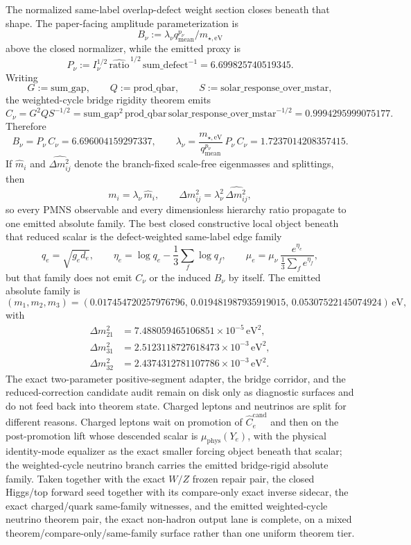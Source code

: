\documentclass[11pt]{article}
\begin{document}
The normalized same-label overlap-defect weight section closes beneath that shape. The paper-facing amplitude parameterization is
\[
B_\nu:=\lambda_\nu q_{\mathrm{mean}}^{p_\nu}/m_{\star,\mathrm{eV}}
\]
above the closed normalizer, while the emitted proxy is
\[
P_\nu:=I_\nu^{1/2}\,\widehat{\mathrm{ratio}}^{\,1/2}\,\mathrm{sum\_defect}^{-1}=6.699825740519345.
\]
Writing
\[
G:=\mathrm{sum\_gap},
\qquad
Q:=\mathrm{prod\_qbar},
\qquad
S:=\mathrm{solar\_response\_over\_mstar},
\]
the weighted-cycle bridge rigidity theorem emits
\[
C_\nu
=
G^2Q S^{-1/2}
=
\mathrm{sum\_gap}^2\,\mathrm{prod\_qbar}\,\mathrm{solar\_response\_over\_mstar}^{-1/2}
=
0.9994295999075177.
\]
Therefore
\[
B_\nu=P_\nu\,C_\nu=6.696004159297337,
\qquad
\lambda_\nu=\frac{m_{\star,\mathrm{eV}}}{q_{\mathrm{mean}}^{p_\nu}}\,P_\nu\,C_\nu=1.7237014208357415.
\]
If \(\hat m_i\) and \(\widehat{\Delta m_{ij}^2}\) denote the branch-fixed scale-free eigenmasses and splittings, then
\[
m_i=\lambda_\nu\,\hat m_i,
\qquad
\Delta m_{ij}^2=\lambda_\nu^2\,\widehat{\Delta m_{ij}^2},
\]
so every PMNS observable and every dimensionless hierarchy ratio propagate to one emitted absolute family.
The best closed constructive local object beneath that reduced scalar is the defect-weighted same-label edge family
\[
q_e=\sqrt{g_e d_e},
\qquad
\eta_e=\log q_e-\frac13\sum_f \log q_f,
\qquad
\mu_e=\mu_\nu\,\frac{e^{\eta_e}}{\frac13\sum_f e^{\eta_f}},
\]
but that family does not emit \(C_\nu\) or the induced \(B_\nu\) by itself. The emitted absolute family is
\[
(m_1,m_2,m_3)=(0.017454720257976796,\,0.019481987935919015,\,0.05307522145074924)\,\mathrm{eV},
\]
with
\[
\begin{aligned}
\Delta m_{21}^2&=7.488059465106851\times10^{-5}\,\mathrm{eV}^2,\\
\Delta m_{31}^2&=2.5123118727618473\times10^{-3}\,\mathrm{eV}^2,\\
\Delta m_{32}^2&=2.4374312781107786\times10^{-3}\,\mathrm{eV}^2.
\end{aligned}
\]
The exact two-parameter positive-segment adapter, the bridge corridor, and the reduced-correction candidate audit remain on disk only as diagnostic surfaces and do not feed back into theorem state. Charged leptons and neutrinos are split for different reasons. Charged leptons wait on promotion of \(\widehat C_e^{\mathrm{cand}}\) and then on the post-promotion lift whose descended scalar is \(\mu_{\mathrm{phys}}(Y_e)\), with the physical identity-mode equalizer as the exact smaller forcing object beneath that scalar; the weighted-cycle neutrino branch carries the emitted bridge-rigid absolute family.
Taken together with the exact \(W/Z\) frozen repair pair, the closed Higgs/top forward seed together with its compare-only exact inverse sidecar, the exact charged/quark same-family witnesses, and the emitted weighted-cycle neutrino theorem pair, the exact non-hadron output lane is complete, on a mixed theorem/compare-only/same-family surface rather than one uniform theorem tier.
\end{document}
